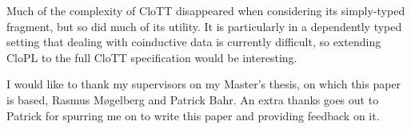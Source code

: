 \documentclass[sigplan,9pt,review]{acmart}\settopmatter{printfolios=true,printccs=false,printacmref=false}
\newcommand{\clott}{\textsf{CloTT}\xspace}
\newcommand{\clopl}{\textsf{CloPL}\xspace}
\begin{document}
Much of the complexity of \clott disappeared when considering its simply-typed fragment, but so
did much of its utility. It is particularly in a dependently typed setting that dealing with
coinductive data is currently difficult, so extending \clopl to the full \clott
specification would be interesting.


\begin{comment}
* paper structure
** Introduction
*** Motivation
**** Guarded Recursion
**** CloTT
**** Short example program
*** Contributions
** The language
*** Example Program
*** Core Calculus
**** Syntax
**** Semantics
**** Typing Rules
** Implementation
*** Type Inference
*** Compilation to Haskell
** (Meta theory)
  - weakening (not provable cuz stable_κ)
  - substitution
  - subject reduction (reduction of expressions preserve their types)
  - normalization
  - type soundness
  - productivity
** Empirical Results
*** Case study
*** Benchmarks
** Related work

# Notes
Declarative:
- kinds: move rules to appendix; explain in text (one or two examples)
- subtyping: move rules to appendix; explain in text (one or two examples)
- rules: remove patterns, tuples and let-bindings (mention in text though)
- Emphasize distinction of variable bindings (lambda- vs let-bound)
  (and why we do it)
- Case study: just map/maap and maybe mention replaceMin (but briefly)
- Use appendix liberally for content
\end{comment}


\begin{acks}                            %
  I would like to thank my supervisors on my Master's thesis, on which this
  paper is based, Rasmus Møgelberg and Patrick Bahr. An extra thanks goes
  out to Patrick for spurring me on to write this paper and providing
  feedback on it.
\end{acks}


\FloatBarrier

%
% 

\end{document}
